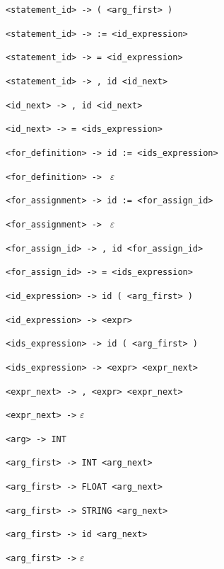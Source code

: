 \documentclass[a4paper, 12pt]{article}
\begin{document}
\begin{enumerate}[noitemsep]
{            \item \verb|<statement_id> -> ( <arg_first> )|
            \item \verb|<statement_id> -> := <id_expression>|
            \item \verb|<statement_id> -> = <id_expression>|
            \item \verb|<statement_id> -> , id <id_next>|
            
            \item \verb|<id_next> -> , id <id_next>|
            \item \verb|<id_next> -> = <ids_expression>|
            
            \item \verb|<for_definition> -> id := <ids_expression>|
            \item \verb|<for_definition> -> | $\varepsilon$
            
            \item \verb|<for_assignment> -> id := <for_assign_id>|
            \item \verb|<for_assignment> -> | $\varepsilon$
            \item \verb|<for_assign_id> -> , id <for_assign_id>|
            \item \verb|<for_assign_id> -> = <ids_expression>|
            
            \item \verb|<id_expression> -> id ( <arg_first> )|
            \item \verb|<id_expression> -> <expr>|
            
            \item \verb|<ids_expression> -> id ( <arg_first> )|
            \item \verb|<ids_expression> -> <expr> <expr_next>|
            
            \item \verb|<expr_next> -> , <expr> <expr_next>|
            \item \verb|<expr_next> ->| $\varepsilon$
        
            \item \verb|<arg> -> INT|
            \item \verb|<arg_first> -> INT <arg_next>|
            \item \verb|<arg_first> -> FLOAT <arg_next>|
            \item \verb|<arg_first> -> STRING <arg_next>|
            \item \verb|<arg_first> -> id <arg_next>|
            \item \verb|<arg_first> ->| $\varepsilon$
           
}
\end{enumerate}
\end{document}
